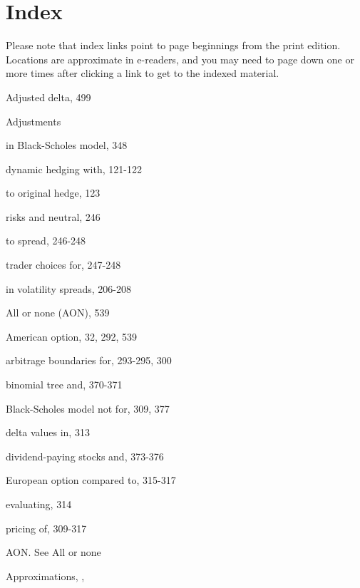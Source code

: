 \chapter{Index}

Please note that index links point to page beginnings from the print edition. Locations are approximate in e-readers, and you may need to page down one or more times after clicking a link to get to the indexed material.\par
\noindent Adjusted delta, 499\par
\noindent Adjustments\par
\noindent in Black-Scholes model, 348\par
\noindent dynamic hedging with, 121-122\par
\noindent to original hedge, 123\par
\noindent risks and neutral, 246\par
\noindent to spread, 246-248\par
\noindent trader choices for, 247-248\par
\noindent in volatility spreads, 206-208\par
\noindent All or none (AON), 539\par
\noindent American option, 32, 292, 539\par
\noindent arbitrage boundaries for, 293-295, 300\par
\noindent binomial tree and, 370-371\par
\noindent Black-Scholes model not for, 309, 377\par
\noindent delta values in, 313\par
\noindent dividend-paying stocks and, 373-376\par
\noindent European option compared to, 315-317\par
\noindent evaluating, 314\par
\noindent pricing of, 309-317\par
\noindent AON. See All or none\par
Approximations, ,\par

